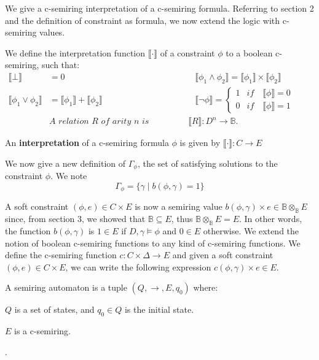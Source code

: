 We give a c-semiring interpretation of a c-semiring formula.
Referring to section 2 and the definition of constraint as formula, we now extend the logic with c-semiring values. 
\begin{definition}
	We define the interpretation function $\llbracket\cdot\rrbracket$ of a constraint $\phi$ to a boolean c-semiring, such that:
	\begin{align*}
		\llbracket \bot  \rrbracket &= 0  &\llbracket \phi_1 \land \phi_2 \rrbracket = \llbracket \phi_1 \rrbracket \times \llbracket \phi_2 \rrbracket \qquad \\
		\llbracket \phi_1 \lor \phi_2 \rrbracket &= \llbracket \phi_1 \rrbracket + \llbracket \phi_2 \rrbracket 	&\llbracket \neg \phi \rrbracket = 
		\begin{cases}
		1 &if \quad \llbracket \phi \rrbracket=0  \\ 
		0 &if \quad \llbracket \phi \rrbracket=1
		\end{cases}
		\qquad  \\
		&\textit{A relation R of arity n is interpreted as }\llbracket R \rrbracket : D^n \rightarrow \mathbb{B}.
	\end{align*}
\end{definition}

\begin{definition} An \textbf{interpretation} of a c-semiring formula $\phi$ is given by $\llbracket\cdot\rrbracket : C \rightarrow E $
\end{definition}

We now give a new definition of $\Gamma_{\phi}$, the set of satisfying solutions to the constraint $\phi$. We note $$\Gamma_{\phi} = \{\gamma \mid b(\phi,\gamma)=1\}$$

A soft constraint $(\phi,e) \in C \times E$ is now a semiring value $b(\phi,\gamma) \times e \in \mathbb{B}\otimes_{\mathbb{B}}E$ since, from section 3, we showed that $\mathbb{B} \subseteq E$, thus $ \mathbb{B}\otimes_{\mathbb{B}}E = E$. In other words, the function $b(\phi,\gamma)$ is $1 \in E$ if $D,\gamma \models \phi$ and $0 \in E$ otherwise. We extend the notion of boolean c-semiring functions to any kind of c-semiring functions. We define the c-semiring function $c : C \times \Delta \rightarrow E$ and given a soft constraint $(\phi,e) \in C\times E$, we can write the following expression $c(\phi,\gamma) \times e \in E$.

\begin{definition}
	A semiring automaton is a tuple $(Q,\rightarrow,E, q_0)$ where:
	\begin{list}{-}{ }
		\item $Q$ is a set of states, and $q_0\in Q$ is the initial state.
		\item $E$ is a c-semiring.
		\item .
	\end{list} 
\end{definition}


